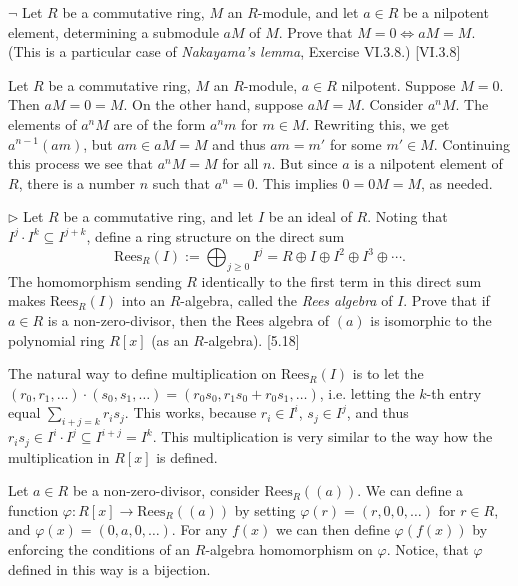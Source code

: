 \begin{problem}
	$\neg$ Let $R$ be a commutative ring, $M$ an $R$-module, and let $a \in R$ be a nilpotent element, determining a submodule $aM$ of $M$. Prove that $M = 0 \iff aM = M$. (This is a particular case of \emph{Nakayama's lemma}, Exercise VI.3.8.) [VI.3.8]
\end{problem}

\begin{solution}
	Let $R$ be a commutative ring, $M$ an $R$-module, $a \in R$ nilpotent. Suppose $M = 0$. Then $aM = 0 = M$.
	On the other hand, suppose $aM = M$. Consider $a^n M$. The elements of $a^n M$ are of the form $a^n m$ for $m \in M$. Rewriting this, we get $a^{n-1} (am)$, but $am \in aM = M$ and thus $am = m'$ for some $m' \in M$. Continuing this process we see that $a^n M = M$ for all $n$. But since $a$ is a nilpotent element of $R$, there is a number $n$ such that $a^n = 0$. This implies $0 = 0 M = M$, as needed.
\end{solution}

\begin{problem}
	$\triangleright$ Let $R$ be a commutative ring, and let $I$ be an ideal of $R$. Noting that $I^j \cdot I^k \subseteq I^{j+k}$, define a ring structure on the direct sum
	\[
		\text{Rees}_R(I) := \bigoplus_{j \geq 0} I^j = R \oplus I \oplus I^2 \oplus I^3 \oplus \cdots \text{.}
	\]
	The homomorphism sending $R$ identically to the first term in this direct sum makes $\text{Rees}_R(I)$ into an $R$-algebra, called the \emph{Rees algebra} of $I$. Prove that if $a \in R$ is a non-zero-divisor, then the Rees algebra of $(a)$ is isomorphic to the polynomial ring $R[x]$ (as an $R$-algebra). [5.18]
\end{problem}

\begin{solution}
	The natural way to define multiplication on $\text{Rees}_R(I)$ is to let the $(r_0, r_1, \dots) \cdot (s_0, s_1, \dots) = (r_0 s_0, r_1 s_0 + r_0 s_1, \dots)$, i.e. letting the $k$-th entry equal $\sum_{i+j=k} r_i s_j$. This works, because $r_i \in I^i$, $s_j \in I^j$, and thus $r_i s_j \in I^i \cdot I^j \subseteq I^{i+j} = I^k$. This multiplication is very similar to the way how the multiplication in $R[x]$ is defined.
	
	Let $a \in R$ be a non-zero-divisor, consider $\text{Rees}_R((a))$. We can define a function $\varphi: R[x] \to \text{Rees}_R((a))$ by setting $\varphi(r) = (r, 0, 0, \dots)$ for $r \in R$, and $\varphi(x) = (0, a, 0, \dots)$. For any $f(x)$ we can then define $\varphi(f(x))$ by enforcing the conditions of an $R$-algebra homomorphism on $\varphi$. Notice, that $\varphi$ defined in this way is a bijection.
\end{solution}


